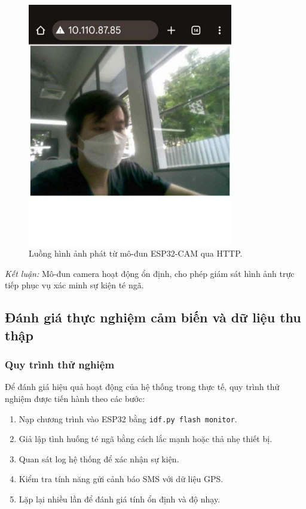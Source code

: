 \begin{figure}[H]
    \centering
    \includegraphics[width=0.8\textwidth]{figures/module1_stream_example.jpg}
    \caption{Luồng hình ảnh phát từ mô-đun ESP32-CAM qua HTTP.}
    \label{fig:camera_stream}
\end{figure}

\textit{Kết luận:} Mô-đun camera hoạt động ổn định, cho phép giám sát hình ảnh trực tiếp phục vụ xác minh sự kiện té ngã.

\subsection{Đánh giá thực nghiệm cảm biến và dữ liệu thu thập}
\subsubsection*{Quy trình thử nghiệm}
Để đánh giá hiệu quả hoạt động của hệ thống trong thực tế, quy trình thử nghiệm được tiến hành theo các bước:
\begin{enumerate}
    \item Nạp chương trình vào ESP32 bằng \texttt{idf.py flash monitor}.  
    \item Giả lập tình huống té ngã bằng cách lắc mạnh hoặc thả nhẹ thiết bị.  
    \item Quan sát log hệ thống để xác nhận sự kiện.  
    \item Kiểm tra tính năng gửi cảnh báo SMS với dữ liệu GPS.  
    \item Lặp lại nhiều lần để đánh giá tính ổn định và độ nhạy.
\end{enumerate}


